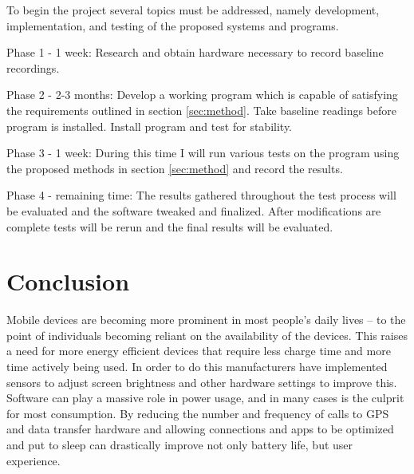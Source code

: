 \documentclass[11pt]{article}
\begin{document}
To begin the project several topics must be addressed, namely development, implementation, and testing of the proposed systems and programs. 

Phase 1 - 1 week: Research and obtain hardware necessary to record baseline recordings.

Phase 2 - 2-3 months: Develop a working program which is capable of satisfying the requirements outlined in section \ref{sec:method}. Take baseline readings before program is installed. Install program and test for stability.

Phase 3 - 1 week: During this time I will run various tests on the program using the proposed methods in section \ref{sec:method} and record the results.

Phase 4 - remaining time: The results gathered throughout the test process will be evaluated and the software tweaked and finalized. After modifications are complete tests will be rerun and the final results will be evaluated.

\vspace*{-.1in}
\section{Conclusion}
\label{sec:conclusion}
\vspace*{-.1in}

Mobile devices are becoming more prominent in most people's daily lives -- to the point of individuals becoming reliant on the availability of the devices. This raises a need for more energy efficient devices that require less charge time and more time actively being used. In order to do this manufacturers have implemented sensors to adjust screen brightness and other hardware settings to improve this. Software can play a massive role in power usage, and in many cases is the culprit for most consumption. By reducing the number and frequency of calls to GPS and data transfer hardware and allowing connections and apps to be optimized and put to sleep can drastically improve not only battery life, but user experience.



\end{document}
